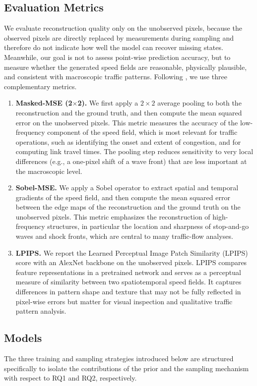 \documentclass[a4paper,fleqn]{cas-sc}
\numberwithin{equation}{section}
\begin{document}
\subsection{Evaluation Metrics}
We evaluate reconstruction quality only on the unobserved pixels, because the observed pixels are directly replaced by measurements during sampling and therefore do not indicate how well the model can recover missing states. Meanwhile, our goal is not to assess point-wise prediction accuracy, but to measure whether the generated speed fields are reasonable, physically plausible, and consistent with macroscopic traffic patterns. Following \citet{choi2025gentle}, we use three complementary metrics.

\begin{enumerate}
  \item \textbf{Masked-MSE (2$\times$2).} We first apply a $2\times2$ average pooling to both the reconstruction and the ground truth, and then compute the mean squared error on the unobserved pixels. This metric measures the accuracy of the low-frequency component of the speed field, which is most relevant for traffic operations, such as identifying the onset and extent of congestion, and for computing link travel times. The pooling step reduces sensitivity to very local differences (e.g., a one-pixel shift of a wave front) that are less important at the macroscopic level.
  \item \textbf{Sobel-MSE.} We apply a Sobel operator to extract spatial and temporal gradients of the speed field, and then compute the mean squared error between the edge maps of the reconstruction and the ground truth on the unobserved pixels. This metric emphasizes the reconstruction of high-frequency structures, in particular the location and sharpness of stop-and-go waves and shock fronts, which are central to many traffic-flow analyses.
  \item \textbf{LPIPS.} We report the Learned Perceptual Image Patch Similarity (LPIPS) score with an AlexNet backbone \citep{zhang2018unreasonable} on the unobserved pixels. LPIPS compares feature representations in a pretrained network and serves as a perceptual measure of similarity between two spatiotemporal speed fields. It captures differences in pattern shape and texture that may not be fully reflected in pixel-wise errors but matter for visual inspection and qualitative traffic pattern analysis.
\end{enumerate}


\subsection{Models}
The three training and sampling strategies introduced below are structured specifically to isolate the contributions of the prior and the sampling mechanism with respect to RQ1 and RQ2, respectively.
\end{document}
